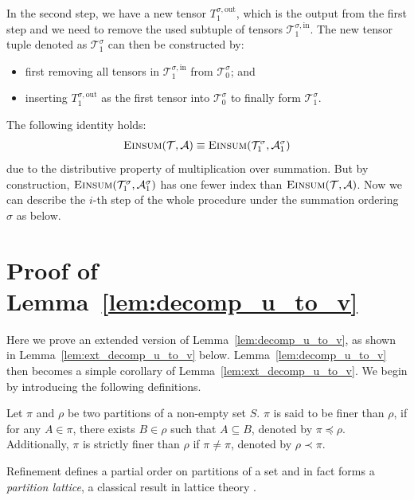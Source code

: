 \documentclass[twoside,11pt]{article}
\newcommand{\Zhang}[1]{{\color{blue}{Zhang: #1}}}
\newcommand{\sPi}{\pi}
\newcommand{\tensorcontraction}{\textsc{Einsum}}
\newcommand{\pleq}{\preceq}
\newcommand{\pless}{\prec}
\def\calA{\mathcal{A}}
\def\calT{\mathcal{T}}
\begin{document}
    In the second step, we have a new tensor $T^{\sigma,\mathrm{out}}_{1}$, which is the output from the first step and we need to remove the used subtuple of tensors $\calT^{\sigma, \mathrm{in}}_{1}$. The new tensor tuple denoted as $\calT^{\sigma}_{1}$ can then be constructed by:
    \begin{itemize}
    \item first removing all tensors in $\calT^{\sigma, \mathrm{in}}_1$ from $\calT_{0}^{\sigma}$; and
    \item inserting $T^{\sigma,\mathrm{out}}_1$ as the first tensor into $\calT_{0}^{\sigma}$ to finally form $\calT^{\sigma}_{1}$.
    \end{itemize}
    \Zhang{the above procedure should have been completed in the first step.}
    The following identity holds:
    \begin{align*}
    \tensorcontraction(\calT, \calA) \equiv \tensorcontraction(\calT^\sigma_1, \calA^\sigma_1) 
    \end{align*}
    due to the distributive property of multiplication over summation. But by construction, $\tensorcontraction(\calT^\sigma_1, \calA^\sigma_1)$ has one fewer index than $\tensorcontraction(\calT, \calA)$. 
    Now we can describe the $i$-th step of the whole procedure under the summation ordering $\sigma$ as below.
\fi

\section{Proof of Lemma~\ref{lem:decomp_u_to_v}}
\label{app:decomp_u_stats}

Here we prove an extended version of Lemma~\ref{lem:decomp_u_to_v}, as shown in Lemma~\ref{lem:ext_decomp_u_to_v} below. Lemma~\ref{lem:decomp_u_to_v} then becomes a simple corollary of Lemma~\ref{lem:ext_decomp_u_to_v}. We begin by introducing the following definitions.

\begin{definition}\label{def:refinement_of_partition}
Let $\sPi$ and $\rho$ be two partitions of a non-empty set $S$. $\sPi$ is said to be finer than $\rho$, if for any $A \in \sPi$, there exists $B \in \rho$ such that $A \subseteq B$, denoted by $\sPi \pleq \rho$. Additionally, $\sPi$ is strictly finer than $\rho$ if $\sPi \neq \sPi$, denoted by $\rho \pless \sPi$. 
\end{definition}

\begin{remark}
Refinement defines a partial order on partitions of a set and in fact forms a \emph{partition lattice}, a classical result in lattice theory \citep{birkhoff1940lattice}. 
\end{remark}
\end{document}
